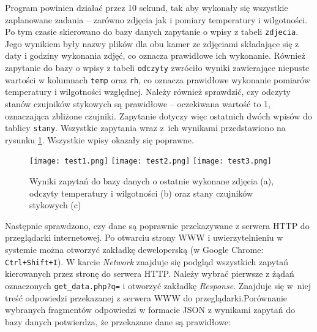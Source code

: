 \documentclass[a4paper,11pt,twoside]{article}
\begin{document}
Program powinien działać przez 10 sekund, tak aby wykonały się wszystkie zaplanowane zadania -- zarówno zdjęcia jak i pomiary temperatury i wilgotności. Po tym czasie skierowano do bazy danych zapytanie o wpisy z tabeli \texttt{zdjecia}. Jego wynikiem były nazwy plików dla obu kamer ze zdjęciami składające się z daty i godziny wykonania zdjęć, co oznacza prawidłowe ich wykonanie. Również zapytanie do bazy o wpisy z tabeli \texttt{odczyty} zwróciło wyniki zawierające niepuste wartości w kolumnach \texttt{temp} oraz \texttt{rh}, co oznacza prawidłowe wykonanie pomiarów temperatury i wilgotności względnej. Należy również sprawdzić, czy odczyty stanów czujników stykowych są prawidłowe -- oczekiwana wartość to 1, oznaczająca zbliżone czujniki. Zapytanie dotyczy więc ostatnich dwóch wpisów do tablicy \texttt{stany}. Wszystkie zapytania wraz z~ich wynikami przedstawiono na rysunku \ref{fig: test1}. Wszystkie wpisy okazały się poprawne.
\begin{figure}
\begin{center}
\texttt{[image: test1.png]}
\texttt{[image: test2.png]}
\texttt{[image: test3.png]}
\caption{Wyniki zapytań do bazy danych o ostatnie wykonane zdjęcia (a), odczyty temperatury i wilgotności (b) oraz stany czujników stykowych (c)}
\label{fig: test1}
\end{center}
\end{figure}

Następnie sprawdzono, czy dane są poprawnie przekazywane z serwera HTTP do przeglądarki internetowej. Po otwarciu strony WWW i uwierzytelnieniu w systemie można otworzyć zakładkę deweloperską  
(w Google Chrome: \texttt{Ctrl+Shift+I}). W karcie \textit{Network} znajduje się podgląd wszystkich zapytań kierowanych przez stronę do serwera HTTP. Należy wybrać pierwsze z żądań oznaczonych \texttt{get{\_}data.php?q=} i otworzyć zakładkę \textit{Response}. Znajduje się w~niej treść odpowiedzi przekazanej z serwera WWW do przeglądarki.\linebreak Porównanie wybranych fragmentów odpowiedzi w formacie JSON z wynikami zapytań do bazy danych potwierdza, że przekazane dane są prawidłowe:
\end{document}

